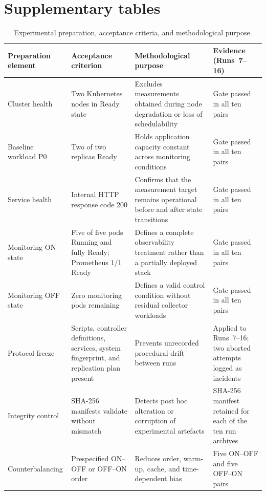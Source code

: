 \documentclass[pdflatex,sn-basic]{sn-jnl}
\theoremstyle{thmstyleone}%
\theoremstyle{thmstyletwo}%
\theoremstyle{thmstylethree}%
\begin{document}
\section*{Supplementary tables}
\begin{table}[t]
\caption{Experimental preparation, acceptance criteria, and methodological purpose.}
\label{tab1}
\centering
\small
\begin{tabularx}{\textwidth}{@{}p{2.6cm}p{3.4cm}X p{2.4cm}@{}}
\toprule
\textbf{Preparation element} & \textbf{Acceptance criterion} & \textbf{Methodological purpose} & \textbf{Evidence (Runs~7--16)} \\
\midrule
Cluster health & Two Kubernetes nodes in Ready state & Excludes measurements obtained during node degradation or loss of schedulability & Gate passed in all ten pairs \\
Baseline workload P0 & Two of two replicas Ready & Holds application capacity constant across monitoring conditions & Gate passed in all ten pairs \\
Service health & Internal HTTP response code 200 & Confirms that the measurement target remains operational before and after state transitions & Gate passed in all ten pairs \\
Monitoring ON state & Five of five pods Running and fully Ready; Prometheus 1/1 Ready & Defines a complete observability treatment rather than a partially deployed stack & Gate passed in all ten pairs \\
Monitoring OFF state & Zero monitoring pods remaining & Defines a valid control condition without residual collector workloads & Gate passed in all ten pairs \\
Protocol freeze & Scripts, controller definitions, services, system fingerprint, and replication plan present & Prevents unrecorded procedural drift between runs & Applied to Runs~7--16; two aborted attempts logged as incidents \\
Integrity control & SHA-256 manifests validate without mismatch & Detects post hoc alteration or corruption of experimental artefacts & SHA-256 manifest retained for each of the ten run archives \\
Counterbalancing & Prespecified ON--OFF or OFF--ON order & Reduces order, warm-up, cache, and time-dependent bias & Five ON--OFF and five OFF--ON pairs \\
\bottomrule
\end{tabularx}
\end{table}
\end{document}
